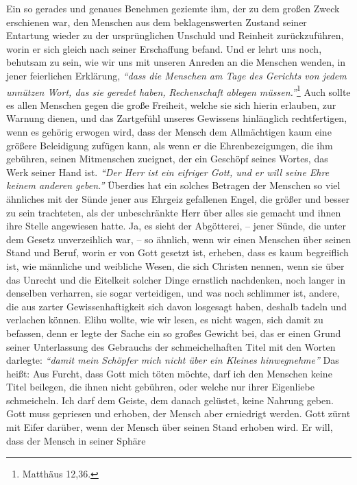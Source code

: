 Ein so gerades und genaues Benehmen geziemte ihm, der zu dem großen Zweck
erschienen war, den Menschen aus dem beklagenswerten Zustand seiner Entartung
wieder zu der ursprünglichen Unschuld und Reinheit zurückzuführen, worin er sich
gleich nach seiner Erschaffung befand. Und er lehrt uns noch, behutsam zu sein,
wie wir uns mit unseren Anreden an die Menschen wenden, in jener feierlichen
Erklärung,
\textit{"`dass die Menschen am Tage des Gerichts von jedem unnützen Wort, das
sie geredet haben, Rechenschaft ablegen
müssen."'}\footnote{Matthäus 12,36.}
Auch sollte es allen Menschen gegen die große Freiheit, welche sie sich hierin
erlauben, zur Warnung dienen, und das Zartgefühl unseres Gewissens hinlänglich
rechtfertigen, wenn es gehörig erwogen wird, dass der Mensch dem Allmächtigen
kaum eine größere Beleidigung zufügen kann, als wenn er die Ehrenbezeigungen,
die ihm gebühren, seinen Mitmenschen zueignet, der ein Geschöpf seines Wortes,
das Werk seiner Hand ist.
\textit{"`Der Herr ist ein eifriger Gott, und er will seine
Ehre keinem anderen geben."'} Überdies hat ein solches Betragen der Menschen so
viel ähnliches mit der Sünde jener aus Ehrgeiz gefallenen Engel, die größer und
besser zu sein trachteten, als der unbeschränkte Herr über alles sie gemacht und
ihnen ihre Stelle angewiesen hatte. Ja, es sieht der Abgötterei, -- jener
Sünde,
die unter dem Gesetz unverzeihlich war, -- so ähnlich, wenn wir einen Menschen
über seinen Stand und Beruf, worin er von Gott gesetzt ist, erheben, dass es
kaum
begreiflich ist, wie männliche und weibliche Wesen, die sich Christen nennen,
wenn sie über das Unrecht und die Eitelkeit solcher Dinge ernstlich nachdenken,
noch langer in denselben verharren, sie sogar verteidigen, und was noch
schlimmer ist, andere, die aus zarter Gewissenhaftigkeit sich davon losgesagt
haben, deshalb tadeln und verlachen können. Elihu wollte, wie wir lesen, es
nicht wagen, sich damit zu befassen, denn er legte der Sache ein so großes
Gewicht bei, das er einen Grund seiner Unterlassung des Gebrauchs der
schmeichelhaften Titel mit den Worten darlegte:
\textit{"`damit mein Schöpfer mich nicht
über ein Kleines hinwegnehme"'} Das heißt: Aus Furcht, dass Gott mich töten
möchte,
darf ich den Menschen keine Titel beilegen, die ihnen nicht gebühren, oder
welche nur ihrer Eigenliebe schmeicheln. Ich darf dem Geiste, dem
danach gelüstet, keine Nahrung geben. Gott muss gepriesen und erhoben, der
Mensch aber erniedrigt werden. Gott zürnt mit Eifer darüber,
wenn der Mensch
über seinen Stand erhoben wird. Er will, dass der Mensch in seiner Sphäre

